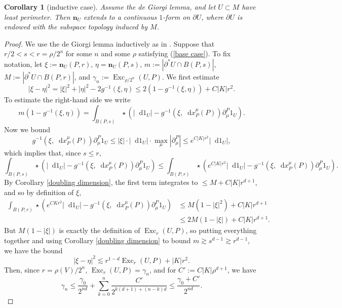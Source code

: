 \documentclass[final,12pt, leqno]{brownthesis}
\DeclareMathOperator{\Exc}{Exc}
\newcommand*\dif{\mathop{}\!\mathrm{d}}
\newcommand{\normal}{\mathbf n}
\newtheorem{corollary}[theorem]{Corollary}
\theoremstyle{definition}
\numberwithin{equation}{section}
\begin{document}
\begin{corollary}[inductive case]
Assume the de Giorgi lemma, and let $U \subset M$ have least perimeter.
Then $\normal_U$ extends to a continuous $1$-form on $\partial U$, where $\partial U$ is endowed with the subspace topology induced by $M$.
\end{corollary}
\begin{proof}
We use the de Giorgi lemma inductively as in \cite[Theorem 8.2]{Giusti77}.
Suppose that $r/2 < s < r = \rho/2^n$ for some $n$ and some $\rho$ satisfying (\ref{base case}).
To fix notation, let
$\xi := \normal_U(P, r)$, $\eta = \normal_U(P, s)$, $m := |\partial^* U \cap B(P, s)|$, $M := |\partial^* U \cap B(P, r)|$, and $\gamma_n := \Exc_{\rho/2^n}(U, P)$.
We first estimate
$$|\xi - \eta|^2 = |\xi|^2 + |\eta|^2 - 2 g^{-1}(\xi, \eta) \leq 2(1 - g^{-1}(\xi, \eta)) + C|K|r^2.$$
To estimate the right-hand side we write
$$m(1 - g^{-1}(\xi, \eta)) = \int_{B(P, s)} \star(|\dif 1_U| - g^{-1}(\xi, \dif x^\mu_P(P)) \partial^P_\mu 1_U).$$
Now we bound
$$ g^{-1}(\xi, \dif x^\mu_P(P)) \partial^P_\mu 1_U \leq |\xi| \cdot |\dif 1_U| \cdot \max_\mu |\partial^P_\mu| \leq e^{C|K|r^2} |\dif 1_U|,$$
which implies that, since $s \leq r$,
$$\int_{B(P, s)} \star(|\dif 1_U| - g^{-1}(\xi, \dif x^\mu_P(P)) \partial^P_\mu 1_U) \leq \int_{B(P, r)} \star(e^{C|K|r^2} |\dif 1_U| - g^{-1}(\xi, \dif x^\mu_P(P)) \partial^P_\mu 1_U).$$
By Corollary \ref{doubling dimension}, the first term integrates to $\leq M + C|K|r^{d + 1}$, and so by definition of $\xi$,
\begin{align*}
\int_{B(P, r)} \star(e^{CKr^2} |\dif 1_U| - g^{-1}(\xi, \dif x^\mu_P(P)) \partial^P_\mu 1_U) &\leq M(1 - |\xi|^2) + C|K|r^{d + 1}\\
&\leq 2M(1 - |\xi|) + C|K|r^{d + 1}.
\end{align*}
But $M(1 - |\xi|)$ is exactly the definition of $\Exc_r(U, P)$, so putting everything together and using Corollary \ref{doubling dimension} to bound $m \gtrsim s^{d - 1} \gtrsim r^{d - 1}$, we have the bound
\begin{equation}\label{just need the excess}
|\xi - \eta|^2 \lesssim r^{1 - d} \Exc_r(U, P) + |K|r^2.
\end{equation}
Then, since $r = \rho(V)/2^n$, $\Exc_r(U, P) = \gamma_n$, and for $C' := C|K|\rho^{d + 1}$, we have
\begin{equation}\label{induction on gamma}
\gamma_n \leq \frac{\gamma_0}{2^{nd}} + \sum_{k=0}^n \frac{C'}{2^{k(d + 1) + (n - k)d}} \leq \frac{\gamma_0 + C'}{2^{nd}}.
\end{equation}

\end{proof}
\end{document}
